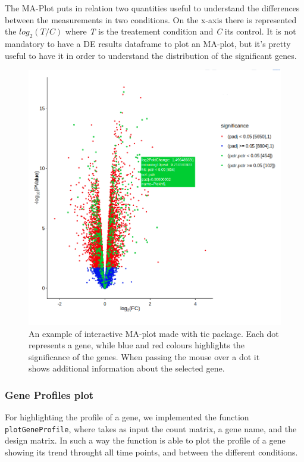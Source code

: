The MA-Plot puts in relation two quantities useful to understand the differences between the measurements in two conditions.
On the x-axis there is represented the $log_2(T/C)$ where \textit{T} is the treatement condition and \textit{C} its control.
It is not mandatory to have a DE results dataframe to plot an MA-plot, but it's pretty useful to have it in order to understand the distribution of the significant genes.
 

\begin{figure}[H]
\includegraphics[width=\textwidth,height=\textheight,keepaspectratio]{img/ticorser/volcano_example.png}
\caption[ticorser MAplot]{An example of interactive MA-plot made with \gls{tic} package. Each dot represents a gene, while blue and red colours highlights the significance of the genes. When passing the mouse over a dot it shows additional information about the selected gene.}
\label{fig:ticorsermaplot}
\centering
\end{figure}


\subsubsection{Gene Profiles plot}
For highlighting the profile of a gene, we implemented the function \lstinline!plotGeneProfile!, where takes as input the count matrix, a gene name, and the design matrix.
In such a way the function is able to plot the profile of a gene showing its trend throught all time points, and between the different conditions.

